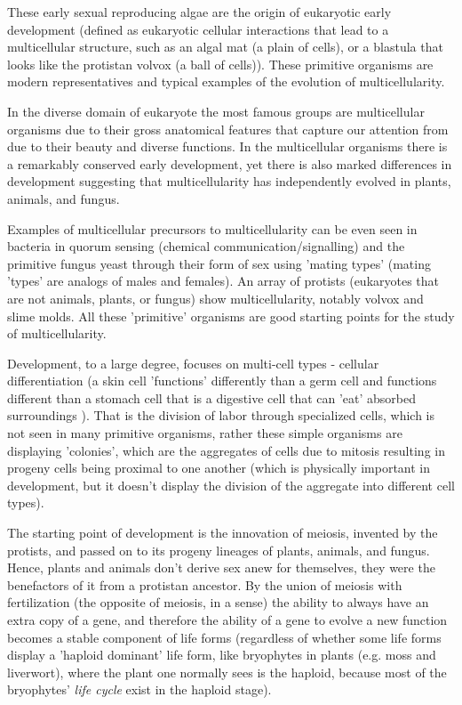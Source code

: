 These early sexual reproducing algae are the origin of eukaryotic early development (defined as eukaryotic cellular interactions that lead to a multicellular structure, such as an algal mat (a plain of cells), or a blastula that looks like the protistan volvox (a ball of cells)\cite{pmid7579526}).  These primitive organisms are modern representatives and typical examples of the evolution of multicellularity.  

In the diverse domain of eukaryote the most famous groups are multicellular organisms due to their gross anatomical features that capture our attention from due to their beauty and diverse functions.  In the multicellular organisms there is a remarkably conserved early development, yet there is also marked differences in development suggesting that multicellularity has independently evolved in plants, animals, and fungus.  

Examples of multicellular precursors to multicellularity can be even seen in bacteria in quorum sensing (chemical communication/signalling) and the primitive fungus yeast through their form of sex using 'mating types' (mating 'types' are analogs of males and females)\cite{pmid7579526}. An array of protists (eukaryotes that are not animals, plants, or fungus) show multicellularity, notably volvox and slime molds.  All these 'primitive' organisms are good starting points for the study of multicellularity. 

Development, to a large degree, focuses on multi-cell types - cellular differentiation (a skin cell 'functions' differently than a germ cell and functions different than a stomach cell that is a digestive cell that can 'eat' absorbed surroundings ).  That is the division of labor through specialized cells, which is not seen in many primitive organisms, rather these simple organisms are displaying 'colonies', which are the aggregates of cells due to mitosis resulting in progeny cells being proximal to one another (which is physically important in development, but it doesn't display the division of the aggregate into different cell types).

The starting point of development is the innovation of meiosis, invented by the protists, and passed on to its progeny lineages of plants, animals, and fungus.  Hence, plants and animals don't derive sex anew for themselves, they were the benefactors of it from a protistan ancestor.  By the union of meiosis with fertilization (the opposite of meiosis, in a sense) the ability to always have an extra copy of a gene, and therefore the ability of a gene to evolve a new function becomes a stable component of life forms (regardless of whether some life forms display a 'haploid dominant' life form, like bryophytes in plants (e.g. moss and liverwort), where the plant one normally sees is the haploid, because most of the bryophytes' \textit{life cycle} exist in the haploid stage).


